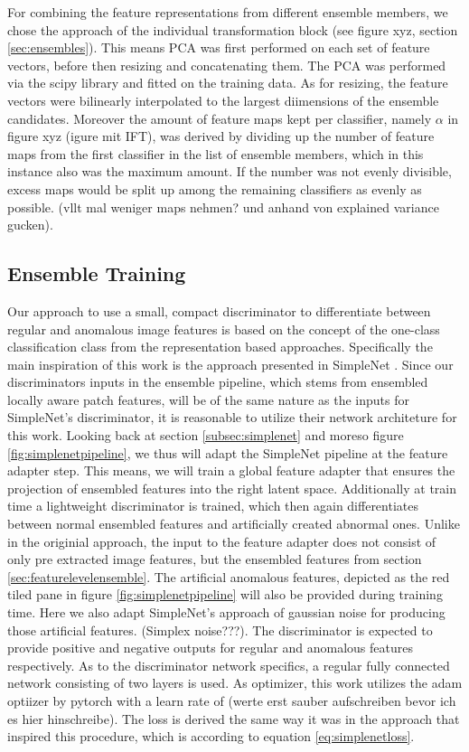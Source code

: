 For combining the feature representations from different ensemble members, we chose the approach of the individual transformation block (see figure xyz, section \ref{sec:ensembles}). This means 
PCA was first performed on each set of feature vectors, before then resizing and concatenating them. The PCA was performed via the scipy library and fitted on the training data. As for resizing, 
the feature vectors were bilinearly interpolated to the largest diimensions of the ensemble candidates. Moreover the amount of feature maps kept per classifier, namely $\alpha$ in figure xyz 
(igure mit IFT), was derived by dividing up the number of feature maps from the first classifier in the list of ensemble members, which in this instance also was the maximum amount. If the number 
was not evenly divisible, excess maps would be split up among the remaining classifiers as evenly as possible. (vllt mal weniger maps nehmen? und anhand von explained variance gucken).



\subsection{Ensemble Training}
\label{sec:discriminator}
Our approach to use a small, compact discriminator to differentiate between regular and anomalous image features is based on the concept of 
the one-class classification class from the representation based approaches. Specifically the main inspiration of this work is the approach 
presented in SimpleNet \cite{liu2023simplenet}. Since our discriminators inputs in the ensemble pipeline, which stems from ensembled locally aware patch features, 
will be of the same nature as 
the inputs for SimpleNet's discriminator, it is reasonable to utilize their network architeture for this work. Looking back at section 
\ref{subsec:simplenet} and moreso figure \ref{fig:simplenetpipeline}, we thus will adapt the SimpleNet pipeline at the feature adapter step. 
This means, we will train a global feature adapter that ensures the projection of ensembled features into the right latent space. Additionally at train time a lightweight discriminator 
is trained, which then again differentiates between normal ensembled features and artificially created abnormal ones. Unlike in the originial approach, the input to the feature adapter 
does not consist of only pre extracted image features, 
but the ensembled features from section \ref{sec:featurelevelensemble}. The artificial anomalous features, 
depicted as the red tiled pane in figure \ref{fig:simplenetpipeline} will also be provided during training time. Here we also adapt SimpleNet's approach of 
gaussian noise for producing those artificial features. (Simplex noise???). The discriminator is expected to provide positive and negative outputs for regular and anomalous features respectively.
As to the discriminator network specifics, a regular fully connected network consisting of two layers is used. As optimizer, this work utilizes the 
adam optiizer by pytorch with a learn rate of (werte erst sauber aufschreiben bevor ich es hier hinschreibe). The loss is derived the same way it was in the approach that inspired this procedure, 
which is according to equation \ref{eq:simplenetloss}.


